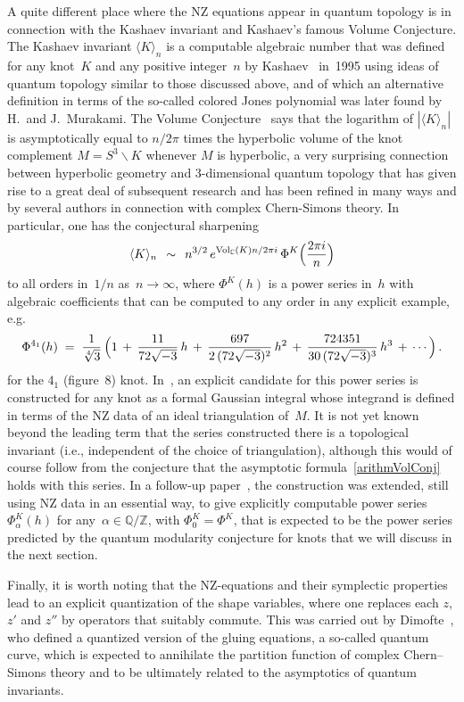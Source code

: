 \documentclass[12pt,reqno]{amsart}
\theoremstyle{definition}
\def\Vol{\mathrm{Vol}}
\def\V{{\Vol_{\C}} }
\def\a{\alpha}
\def\={\;=\;}
\def\+{\,+\,}
\def\be{\begin{equation}}
\def\ee{\end{equation}}
\def\sm{\smallsetminus}
\def\C{\mathbb C}
\def\Z{\mathbb Z}
\def\Q{\mathbb Q}
\def\ssm{\sm}
\begin{document}
A quite different place where the NZ equations appear in quantum topology is in 
connection with the Kashaev invariant and Kashaev's famous Volume Conjecture.  
The Kashaev invariant $\langle K\rangle_n$ is a computable algebraic number that was
defined for any knot~$K$ and any positive integer~$n$ by Kashaev~\cite{K95} in~1995 using
ideas of quantum topology similar to those discussed above, and of which an alternative
definition in terms of the so-called colored Jones polynomial was later found by
H.~and J.~Murakami.  The Volume Conjecture~\cite{K97} says that the logarithm of
$|\langle K\rangle_n|$ is asymptotically equal to $n/2\pi$ times the hyperbolic volume
of the knot complement $M=S^3\ssm K$ whenever $M$ is hyperbolic, a very surprising
connection between hyperbolic geometry and 3-dimensional quantum topology that has
given rise to a great deal of subsequent research and has been refined in many ways
and by several authors in connection with complex Chern-Simons theory. In particular,
one has the conjectural sharpening~\cite{Gar:Viet, DGLZ} 
\be
\label{arithmVolConj}
\langle K\rangle_n \;\, \sim  \;\,
n^{3/2}\, e^{\V(K)n/2\pi i}\,\Phi^K\Bigl(\frac{2\pi i}n\Bigr) 
\ee
to all orders in~$1/n$ as~$n\to\infty$, where $\Phi^K(h)$ is a power series in~$h$ with
algebraic coefficients that can be computed to any order in any explicit example, e.g.
\be
\label{as41}
\Phi^{4_1}(h)\=  \frac1{\sqrt[4]{3}}\, 
\Bigl(1 \+ \frac{11}{72\sqrt{-3}}\,h \+ \frac{697}{2\,(72\sqrt{-3})^2}\,h^2
 \+ \frac{724351}{30\,(72\sqrt{-3})^3}\,h^3 \+\cdots\Bigr)\,. 
\ee
for the $4_1$ (figure~8) knot. In~\cite{DG}, an explicit candidate for this power series 
is constructed for any knot as a formal Gaussian integral whose integrand is defined in
terms of the NZ data of an ideal triangulation of~$M$.  It is not yet known beyond the
leading term that the series constructed there is a topological invariant (i.e.,
independent of the choice of triangulation), although this would of course follow from
the conjecture that the asymptotic formula~\eqref{arithmVolConj} holds with this series.
In a follow-up paper~\cite{DG2}, the construction was extended, still using NZ data in
an essential way, to give explicitly computable power series $\Phi_\a^K(h)$ for
any~$\a\in\Q/\Z$, with $\Phi_0^K=\Phi^K$, that is expected to be the power series
predicted by the quantum modularity conjecture for knots that we will discuss in the
next section.

Finally, it is worth noting that the NZ-equations and their symplectic properties
lead to an explicit quantization of the shape variables, where one replaces each
$z$, $z'$ and $z''$ by operators that suitably commute. This was carried out by 
Dimofte~\cite{Dimofte:quantum}, who defined a quantized version of the gluing equations, 
a so-called quantum curve, which is expected to annihilate the partition function 
of complex Chern--Simons theory and to be ultimately related to the asymptotics of
quantum invariants.
\end{document}
